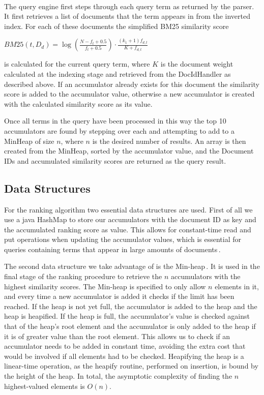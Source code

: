 \paragraph*{}
The query engine first steps through each query term as returned by the parser. It first retrieves a list of documents that the term appears in from the inverted index. For each of these documents the simplified BM25 similarity score\\
\begin{center}
$BM25(t, D_d) = \log \left( \frac{N - f_t + 0.5}{f_t + 0.5} \right) \cdot \frac{(k_1 + 1) f_{d,t}}{K + f_{d,t}}$\\
\end{center}
is calculated for the current query term, where $K$ is the document weight calculated at the indexing stage and retrieved from the DocIdHandler as described above.
If an accumulator already exists for this document the similarity score is added to the accumulator value, otherwise a new accumulator is created with the calculated similarity score as its value.

Once all terms in the query have been processed in this way the top 10 accumulators are found by stepping over each and attempting to add to a MinHeap of size $n$, where $n$ is the desired number of results. An array is then created from the MinHeap, sorted by the accumulator value, and the Document IDs and accumulated similarity scores are returned as the query result.

\subsection*{Data Structures}
For the ranking algorithm two essential data structures are used. First of all we use a java HashMap to store our accumulators with the document ID as key and the accumulated ranking score as value. This allows for constant-time read and put operations when updating the accumulator values, which is essential for queries containing terms that appear in large amounts of documents\,\cite{hashmap}.

The second data structure we take advantage of is the Min-heap\,\cite{wolfram13}. It is used in the final stage of the ranking procedure to retrieve the $n$ accumulators with the highest similarity scores. The Min-heap is specified to only allow $n$ elements in it, and every time a new accumulator is added it checks if the limit has been reached. If the heap is not yet full, the accumulator is added to the heap and the heap is heapified. If the heap is full, the accumulator's value is checked against that of the heap's root element and the accumulator is only added to the heap if it is of greater value than the root element. This allows us to check if an accumulator needs to be added in constant time, avoiding the extra cost that would be involved if all elements had to be checked. Heapifying the heap is a linear-time operation, as the heapify routine, performed on insertion, is bound by the height of the heap. In total, the asymptotic complexity of finding the $n$ highest-valued elements is $O(n)$.
